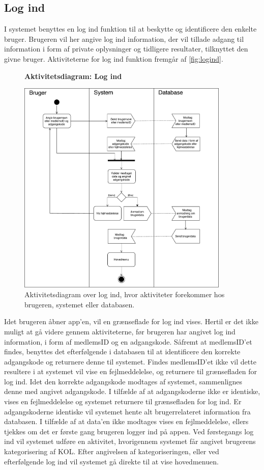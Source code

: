 \subsection*{Log ind}
I systemet benyttes en log ind funktion til at beskytte og identificere den enkelte bruger. Brugeren vil her angive log ind information, der vil tillade adgang til information i form af private oplysninger og tidligere resultater, tilknyttet den givne bruger. Aktiviteterne for log ind funktion fremgår af \autoref{fig:logind}.    


\begin{figure} [H]
\centering
\textbf{Aktivitetsdiagram: Log ind}\par\medskip
\includegraphics[width=0.9\textwidth]{figures/aktivitetsdiagram/Logind}
\caption{Aktivitetsdiagram over log ind, hvor aktiviteter forekommer hos brugeren, systemet eller databasen.}
\label{fig:logind}
\end{figure}


\noindent
Idet brugeren åbner app'en, vil en grænseflade for log ind vises. Hertil er det ikke muligt at gå videre gennem aktiviteterne, før brugeren har angivet log ind information, i form af medlemsID og en adgangskode. 
Såfremt at medlemsID'et findes, benyttes det efterfølgende i databasen til at identificere den korrekte adgangskode og returnere denne til systemet. Findes medlemsID'et ikke vil dette resultere i at systemet vil vise en fejlmeddelelse, og returnere til grænsefladen for log ind. 
Idet den korrekte adgangskode modtages af systemet, sammenlignes denne med angivet adgangskode. I tilfælde af at adgangskoderne ikke er identiske, vises en fejlmeddelelse og systemet returnere til grænsefladen for log ind. Er adgangskoderne identiske vil systemet hente alt brugerrelateret information fra databasen. I tilfælde af at data'en ikke modtages vises en fejlmeddelelse, ellers tjekkes om det er første gang brugeren logger ind på appen. 
Ved førstegangs log ind vil systemet udføre en aktivitet, hvorigennem systemet får angivet brugerens kategorisering af KOL. Efter angivelsen af kategoriseringen, eller ved efterfølgende log ind vil systemet gå direkte til at vise hovedmenuen.  
    

